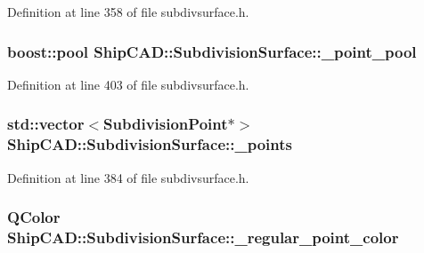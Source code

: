 Definition at line 358 of file subdivsurface.\-h.

\hypertarget{classShipCAD_1_1SubdivisionSurface_a98af3f1b9fa4412756cadf4fe561f062}{
\subsubsection[{\-\_\-point\-\_\-pool}]{\setlength{\rightskip}{0pt plus 5cm}boost\-::pool Ship\-C\-A\-D\-::\-Subdivision\-Surface\-::\-\_\-point\-\_\-pool\hspace{0.3cm}{\ttfamily [protected]}}}\label{classShipCAD_1_1SubdivisionSurface_a98af3f1b9fa4412756cadf4fe561f062}


Definition at line 403 of file subdivsurface.\-h.

\hypertarget{classShipCAD_1_1SubdivisionSurface_ab03b7f4694a63eeb3ebb831484cb1bff}{
\subsubsection[{\-\_\-points}]{\setlength{\rightskip}{0pt plus 5cm}std\-::vector$<${\bf Subdivision\-Point}$\ast$$>$ Ship\-C\-A\-D\-::\-Subdivision\-Surface\-::\-\_\-points\hspace{0.3cm}{\ttfamily [protected]}}}\label{classShipCAD_1_1SubdivisionSurface_ab03b7f4694a63eeb3ebb831484cb1bff}


Definition at line 384 of file subdivsurface.\-h.

\hypertarget{classShipCAD_1_1SubdivisionSurface_afee1585e376c34aa9b3be47f3a174cdb}{
\subsubsection[{\-\_\-regular\-\_\-point\-\_\-color}]{\setlength{\rightskip}{0pt plus 5cm}Q\-Color Ship\-C\-A\-D\-::\-Subdivision\-Surface\-::\-\_\-regular\-\_\-point\-\_\-color\hspace{0.3cm}{\ttfamily [protected]}}}\label{classShipCAD_1_1SubdivisionSurface_afee1585e376c34aa9b3be47f3a174cdb}


